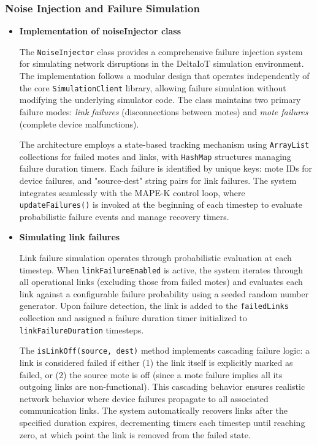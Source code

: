 \subsubsection{Noise Injection and Failure Simulation}
\begin{itemize}
    \item \textbf{Implementation of noiseInjector class}
    
    The \texttt{NoiseInjector} class provides a comprehensive failure injection system for simulating network disruptions in the DeltaIoT simulation environment. The implementation follows a modular design that operates independently of the core \texttt{SimulationClient} library, allowing failure simulation without modifying the underlying simulator code. The class maintains two primary failure modes: \textit{link failures} (disconnections between motes) and \textit{mote failures} (complete device malfunctions). 
    
    The architecture employs a state-based tracking mechanism using \texttt{ArrayList} collections for failed motes and links, with \texttt{HashMap} structures managing failure duration timers. Each failure is identified by unique keys: mote IDs for device failures, and "source-dest" string pairs for link failures. The system integrates seamlessly with the MAPE-K control loop, where \texttt{updateFailures()} is invoked at the beginning of each timestep to evaluate probabilistic failure events and manage recovery timers.
    
    \item \textbf{Simulating link failures}
    
    Link failure simulation operates through probabilistic evaluation at each timestep. When \texttt{linkFailureEnabled} is active, the system iterates through all operational links (excluding those from failed motes) and evaluates each link against a configurable failure probability using a seeded random number generator. Upon failure detection, the link is added to the \texttt{failedLinks} collection and assigned a failure duration timer initialized to \texttt{linkFailureDuration} timesteps.
    
    The \texttt{isLinkOff(source, dest)} method implements cascading failure logic: a link is considered failed if either (1) the link itself is explicitly marked as failed, or (2) the source mote is off (since a mote failure implies all its outgoing links are non-functional). This cascading behavior ensures realistic network behavior where device failures propagate to all associated communication links. The system automatically recovers links after the specified duration expires, decrementing timers each timestep until reaching zero, at which point the link is removed from the failed state.
    

\end{itemize}
